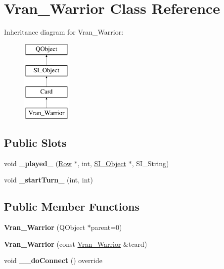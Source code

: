 \hypertarget{class_vran___warrior}{}\section{Vran\+\_\+\+Warrior Class Reference}
\label{class_vran___warrior}
Inheritance diagram for Vran\+\_\+\+Warrior\+:\begin{figure}[H]
\begin{center}
\leavevmode
\includegraphics[height=4.000000cm]{class_vran___warrior}
\end{center}
\end{figure}
\subsection*{Public Slots}
\begin{DoxyCompactItemize}
\item 
\mbox{\label{class_vran___warrior_ac9350a7949f3474f9192c3ec9d39b5cd}} 
void {\bfseries \+\_\+played\+\_\+} (\hyperlink{class_card_set}{Row} $\ast$, int, \hyperlink{class_s_i___object}{S\+I\+\_\+\+Object} $\ast$, S\+I\+\_\+\+String)
\item 
\mbox{\label{class_vran___warrior_ac56116ca6b967086b7c126ab15504324}} 
void {\bfseries \+\_\+start\+Turn\+\_\+} (int, int)
\end{DoxyCompactItemize}
\subsection*{Public Member Functions}
\begin{DoxyCompactItemize}
\item 
\mbox{\label{class_vran___warrior_a28085c24041149223b92deb2c9a0597d}} 
{\bfseries Vran\+\_\+\+Warrior} (Q\+Object $\ast$parent=0)
\item 
\mbox{\label{class_vran___warrior_a841b79d268f80070a02e0fdb4f69a521}} 
{\bfseries Vran\+\_\+\+Warrior} (const \hyperlink{class_vran___warrior}{Vran\+\_\+\+Warrior} \&tcard)
\item 
\mbox{\label{class_vran___warrior_a79bb84981f777363166b18522d01b5cc}} 
void {\bfseries \+\_\+\+\_\+do\+Connect} () override
\end{DoxyCompactItemize}
